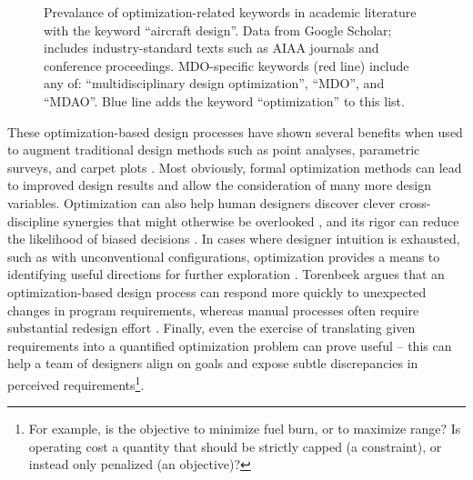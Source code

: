 \documentclass[12pt,vi,oneside]{report}
\begin{document}
    \begin{figure}[h]
        \centering
        \caption{Prevalance of optimization-related keywords in academic literature with the keyword ``aircraft design''. Data from Google Scholar; includes industry-standard texts such as AIAA journals and conference proceedings. MDO-specific keywords (red line) include any of: ``multidisciplinary design optimization'', ``MDO'', and ``MDAO''. Blue line adds the keyword ``optimization'' to this list.}
        \label{fig:mdo_citation_counts}
    \end{figure}

    These optimization-based design processes have shown several benefits when used to augment traditional design methods such as point analyses, parametric surveys, and carpet plots \cite{torenbeek_advanced_2013}. Most obviously, formal optimization methods can lead to improved design results and allow the consideration of many more design variables. Optimization can also help human designers discover clever cross-discipline synergies that might otherwise be overlooked \cite{drela_pros_1998}, and its rigor can reduce the likelihood of biased decisions \cite{torenbeek_advanced_2013}. In cases where designer intuition is exhausted, such as with unconventional configurations, optimization provides a means to identifying useful directions for further exploration \cite{drela_pros_1998}. Torenbeek argues that an optimization-based design process can respond more quickly to unexpected changes in program requirements, whereas manual processes often require substantial redesign effort \cite{torenbeek_advanced_2013}. Finally, even the exercise of translating given requirements into a quantified optimization problem can prove useful -- this can help a team of designers align on goals and expose subtle discrepancies in perceived requirements\footnote{For example, is the objective to minimize fuel burn, or to maximize range? Is operating cost a quantity that should be strictly capped (a constraint), or instead only penalized (an objective)?}.
\end{document}
